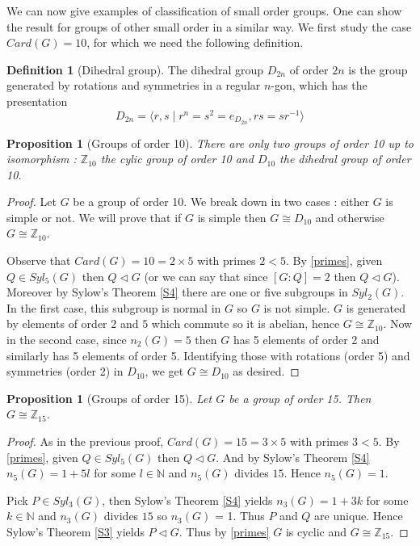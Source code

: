 \documentclass{article}
\theoremstyle{definition}
\theoremstyle{plain}
\theoremstyle{plain}
\theoremstyle{plain}
\theoremstyle{plain}
\theoremstyle{definition}
\newtheorem{defeng}[subsubsection]{Definition}
\theoremstyle{plain}
\theoremstyle{plain}
\newtheorem{propeng}[subsubsection]{Proposition}
\begin{document}
\par We can now give examples of classification of small order groups. One can show the result for groups of other small order in a similar way. We first study the case \( Card(G) = 10 \), for which we need the following definition.
\begin{defeng}[Dihedral group]
	The dihedral group \( D_{2n} \) of order \( 2n \) is the group generated by rotations and symmetries in a regular \(n\)-gon, which has the presentation 
	\begin{equation*}
		D_{2n} = \langle r,s \mid r^{n} = s^{2} = e_{D_{2n}}, rs = sr^{-1} \rangle 
	\end{equation*}
\end{defeng}

\begin{propeng}[Groups of order 10]
	There are only two groups of order 10 up to isomorphism : \( \mathbb{Z}_{10} \) the cylic group of order 10 and \( D_{10} \) the dihedral group of order 10.
\end{propeng}

\begin{proof}
	Let \( G \) be a group of order 10. We break down in two cases : either \( G \) is simple or not. We will prove that if \( G \) is simple then \( G \cong D_{10} \) and otherwise \( G \cong \mathbb{Z}_{10} \).

	Observe that \( Card(G) = 10 = 2 \times 5 \) with primes \( 2 < 5\). By \cref{primes}, given \( Q \in Syl_5(G) \) then \( Q \triangleleft G \) (or we can say that since \( [G:Q] = 2 \) then \( Q \triangleleft G \)).
	Moreover by Sylow's Theorem \ref{S4} there are one or five subgroups in \( Syl_2(G) \). In the first case, this subgroup is normal in \( G \) so \( G \) is not simple. \( G \) is generated by elements of order \( 2 \) and \( 5 \) which commute so it is abelian, hence \( G \cong \mathbb{Z}_{10} \). Now in the second case, since \( n_2(G) = 5 \) then \( G \) has 5 elements of order 2 and similarly has 5 elements of order 5. Identifying those with rotations (order 5) and symmetries (order 2) in \( D_{10} \), we get \( G \cong D_{10} \) as desired.
\end{proof} 

\begin{propeng}[Groups of order 15]
Let \( G \) be a group of order 15. Then \( G \cong \mathbb{Z}_{15} \).
\end{propeng}

\begin{proof}
	As in the previous proof, \( Card(G) = 15 = 3 \times 5 \) with primes \( 3 < 5 \). By \cref{primes}, given \( Q \in Syl_5(G) \) then \( Q \triangleleft G \). And by Sylow's Theorem \ref{S4} \( n_5(G) = 1 + 5l \) for some \( l \in \mathbb{N} \) and \( n_5(G) \) divides \( 15 \). Hence \( n_5(G) = 1 \). 

	Pick \( P \in Syl_3(G) \), then Sylow's Theorem \ref{S4} yields \( n_3(G) = 1 + 3k \) for some \( k \in \mathbb{N} \) and \( n_3(G) \) divides \( 15 \) so \( n_3(G) \) = 1. Thus \( P \) and \( Q \) are unique. Hence Sylow's Theorem \ref{S3} yields \( P \triangleleft G \). Thus by \cref{primes} \( G \) is cyclic and \( G \cong \mathbb{Z}_{15} \).
\end{proof}
\end{document}
